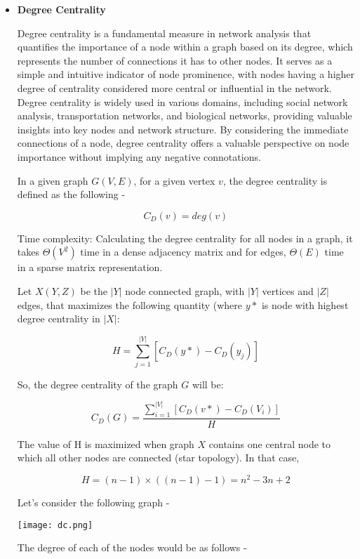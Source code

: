 \documentclass{article}
\begin{document}
\begin{itemize}

\item \textbf{Degree Centrality}

Degree centrality is a fundamental measure in network analysis that quantifies the importance of a node within a graph based on its degree, which represents the number of connections it has to other nodes. It serves as a simple and intuitive indicator of node prominence, with nodes having a higher degree of centrality considered more central or influential in the network. Degree centrality is widely used in various domains, including social network analysis, transportation networks, and biological networks, providing valuable insights into key nodes and network structure. By considering the immediate connections of a node, degree centrality offers a valuable perspective on node importance without implying any negative connotations.

In a given graph $G(V, E)$, for a given vertex $v$, the degree centrality is defined as the following -

$$ C_{D}(v) = deg(v) $$

Time complexity: Calculating the degree centrality for all nodes in a graph, it takes $\Theta(V^{2})$ time in a dense adjacency matrix and for edges, $\Theta(E)$ time in a sparse matrix representation.

Let $X(Y,Z)$ be the $|Y|$ node connected graph, with $|Y|$ vertices and $|Z|$ edges, that maximizes the following quantity (where $y*$ is node with highest degree centrality in $|X|$:

$$ H = \sum_{j = 1}^{|Y|} [C_{D}(y*) - C_{D}(y_{j})]$$

So, the degree centrality of the graph $G$ will be:

$$ C_{D}(G) = \frac{\sum_{i=1}^{|V|}[C_{D}(v*) - C_{D}(V_i)]}{H} $$

The value of H is maximized when graph $X$ contains one central node to which all other nodes are connected (star topology). In that case, 

$$H = (n-1) \times ((n-1)-1) = n^{2}-3n+2 $$

Let's consider the following graph - 

\begin{center}
    \texttt{[image: dc.png]}
\end{center}

The degree of each of the nodes would be as follows -


\end{itemize}
\end{document}
